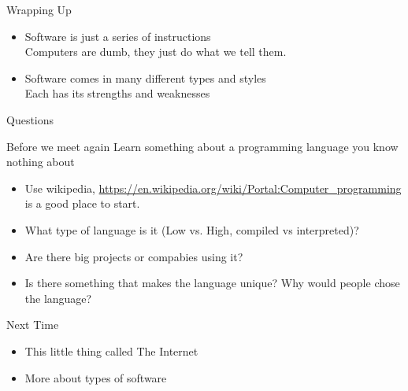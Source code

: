 \documentclass[serif,mathserif,compress]{beamer}
\begin{document}
\begin{frame}{Wrapping Up}
  \begin{itemize}
    \item Software is just a series of instructions\\Computers are dumb, they just do what we tell them.
    \item Software comes in many different types and styles\\Each has its strengths and weaknesses
  \end{itemize}
\end{frame}

\begin{frame}{Questions}
\end{frame}

\begin{frame}{Before we meet again}
  Learn something about a programming language you know nothing about
  \begin{itemize}
    \item Use wikipedia, \url{https://en.wikipedia.org/wiki/Portal:Computer_programming} is a good place to start.
    \item What type of language is it (Low vs. High, compiled vs interpreted)?
    \item Are there big projects or compabies using it?
    \item Is there something that makes the language unique? Why would people chose the language?
  \end{itemize}
\end{frame}

\begin{frame}{Next Time}
  \begin{itemize}
    \item This little thing called The Internet
    \item More about types of software
  \end{itemize}
\end{frame}
\end{document}
